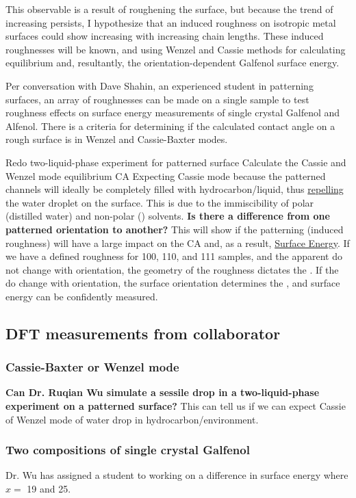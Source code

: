 \begin{outline}[enumerate]
	This observable \ca is a result of roughening the surface, but because the trend of increasing \ca persists, I hypothesize that an induced roughness on isotropic metal surfaces could show increasing \ca[s] with increasing \nalk chain lengths. These induced roughnesses will be known, and using Wenzel\cite{Wenzel1936,Wenzel1949a} and Cassie\cite{Cassie1944} methods for calculating equilibrium \ca[s] and, resultantly, the orientation-dependent Galfenol surface energy. 
		
	\2 Per conversation with Dave Shahin, an experienced student in patterning surfaces, an array of roughnesses can be made on a single sample to test roughness effects on surface energy measurements of single crystal Galfenol and Alfenol. 
		\3 There is a criteria for determining if the calculated contact angle on a rough surface is in Wenzel and Cassie-Baxter modes.\cite[p. 53]{Milne2012}
	
\1 Redo two-liquid-phase experiment for patterned surface
	\2 Calculate the Cassie and Wenzel mode equilibrium CA
		\3 Expecting Cassie mode because the patterned channels will ideally be completely filled with hydrocarbon/\nalk liquid, thus \underline{repelling} the water droplet on the surface. This is due to the immiscibility of polar (distilled water) and non-polar (\nalk) solvents. 
	\2 \textbf{Is there a difference from one patterned orientation to another?} This will show if the patterning (induced roughness) will have a large impact on the CA and, as a result, \underline{Surface Energy}. 
		\3 If we have a defined roughness for {100}, {110}, and {111} samples, and the apparent \ca[s] do not change with orientation, the geometry of the roughness dictates the \ca. 
		\3 If the \ca[s] do change with orientation, the surface orientation determines the \ca, and surface energy can be confidently measured.
\end{outline}




\subsection{DFT measurements from collaborator}
\subsubsection{Cassie-Baxter or Wenzel mode}
\textbf{Can Dr. Ruqian Wu simulate a sessile drop in a two-liquid-phase experiment on a patterned surface?} This can tell us if we can expect Cassie of Wenzel mode of water drop in hydrocarbon/\nalk environment. 

\subsubsection{Two compositions of single crystal Galfenol}
Dr. Wu has assigned a student to working on a difference in \fegacomp surface energy where $x =$ 19 and 25.